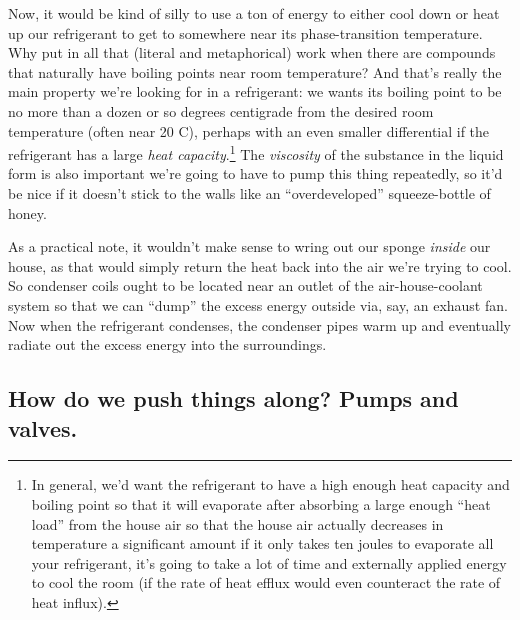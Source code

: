 \documentclass[../main/main.tex]{subfiles}
\begin{document}
Now, it would be kind of silly to use a ton of energy
to either cool down or heat up our refrigerant to get to
somewhere near its phase-transition temperature.
Why put in all that (literal and metaphorical) work when
there are compounds that naturally have boiling points near
room temperature?
And that's really the main property we're looking for in
a refrigerant: we wants its boiling point to be no more
than a dozen or so degrees centigrade
from the desired room temperature (often near 20 \textdegree C),
perhaps with an even smaller differential if the
refrigerant has a large \emph{heat capacity}.\footnote
{
    In general, we'd want the refrigerant to have a high enough
    heat capacity and boiling point so that it will evaporate
    after absorbing a large enough ``heat load'' from the house air
    so that the house air actually decreases in temperature
    a significant amount \textemdash{} if it only takes ten joules
    to evaporate all your refrigerant, it's going to take a lot
    of time and externally applied energy to cool the room
    (if the rate of heat efflux would even counteract the
    rate of heat influx).
} The 
\emph{viscosity} of the substance in the liquid form is
also important \textemdash{} we're going to have to pump this
thing repeatedly, so it'd be nice if it doesn't stick to the walls
like an ``overdeveloped'' squeeze-bottle of honey.\par

As a practical note, it wouldn't make sense to wring out our sponge
\emph{inside} our house, as that would simply return the heat
back into the air we're trying to cool.
So condenser coils ought to be located near an outlet of
the air-house-coolant system so that we can ``dump'' the excess
energy outside via, say, an exhaust fan.
Now when the refrigerant condenses, the condenser pipes warm up
and eventually radiate out the excess energy into the surroundings.

\subsection{How do we push things along? Pumps and valves.}
\end{document}
